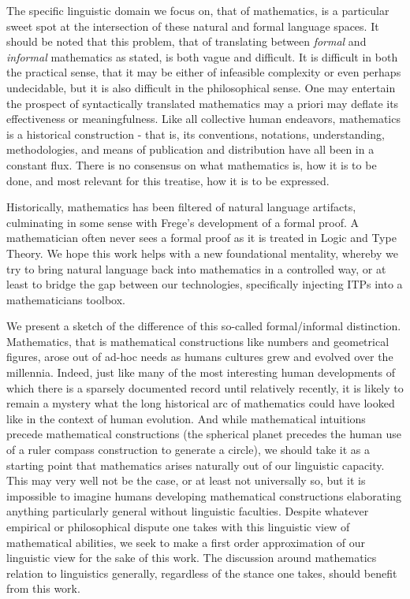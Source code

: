 The specific linguistic domain we focus on, that of mathematics, is a particular
sweet spot at the intersection of these natural and formal language spaces. It
should be noted that this problem, that of translating between \emph{formal} and
\emph{informal} mathematics as stated, is both vague and difficult. It is
difficult in both the practical sense, that it may be either of infeasible
complexity or even perhaps undecidable, but it is also difficult in the
philosophical sense. One may entertain the prospect of syntactically translated
mathematics may a priori may deflate its effectiveness or meaningfulness. Like
all collective human endeavors, mathematics is a historical construction - that
is, its conventions, notations, understanding, methodologies, and means of
publication and distribution have all been in a constant flux. There is no
consensus on what mathematics is, how it is to be done, and most relevant for
this treatise, how it is to be expressed.

Historically, mathematics has been filtered of natural language artifacts,
culminating in some sense with Frege's development of a formal proof. A
mathematician often never sees a formal proof as it is treated in Logic and Type
Theory. We hope this work helps with a new foundational mentality, whereby we
try to bring natural language back into mathematics in a controlled way, or at
least to bridge the gap between our technologies, specifically injecting ITPs
into a mathematicians toolbox.


We present a sketch of the difference of this so-called formal/informal
distinction. Mathematics, that is mathematical constructions like numbers and
geometrical figures, arose out of ad-hoc needs as humans cultures grew and
evolved over the millennia. Indeed, just like many of the most interesting human
developments of which there is a sparsely documented record until relatively
recently, it is likely to remain a mystery what the long historical arc of
mathematics could have looked like in the context of human evolution. And while
mathematical intuitions precede mathematical constructions (the spherical planet
precedes the human use of a ruler compass construction to generate a circle), we
should take it as a starting point that mathematics arises naturally out of our
linguistic capacity. This may very well not be the case, or at least not
universally so, but it is impossible to imagine humans developing mathematical
constructions elaborating anything particularly general without linguistic
faculties. Despite whatever empirical or philosophical dispute one takes with
this linguistic view of mathematical abilities, we seek to make a first order
approximation of our linguistic view for the sake of this work. The discussion around
mathematics relation to linguistics generally, regardless of the stance
one takes, should benefit from this work.

